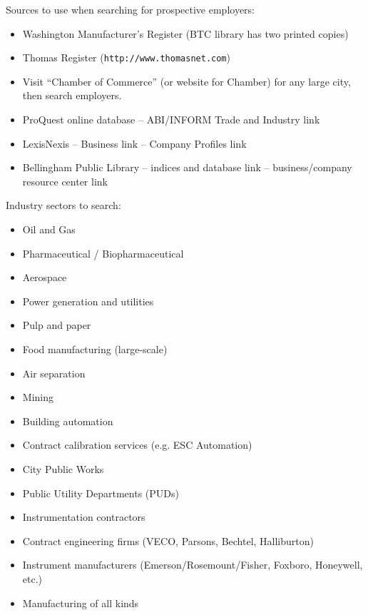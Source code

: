 





Sources to use when searching for prospective employers:

\begin{itemize}
\item{} Washington Manufacturer's Register (BTC library has two printed copies)
\item{} Thomas Register ({\tt http://www.thomasnet.com})
\item{} Visit ``Chamber of Commerce'' (or website for Chamber) for any large city, then search employers.
\item{} ProQuest online database -- ABI/INFORM Trade and Industry link
\item{} LexisNexis -- Business link -- Company Profiles link
\item{} Bellingham Public Library -- indices and database link -- business/company resource center link
\end{itemize}

\vskip 10pt

Industry sectors to search:

\begin{itemize}
\item{} Oil and Gas
\item{} Pharmaceutical / Biopharmaceutical
\item{} Aerospace
\item{} Power generation and utilities
\item{} Pulp and paper
\item{} Food manufacturing (large-scale)
\item{} Air separation
\item{} Mining
\item{} Building automation
\item{} Contract calibration services (e.g. ESC Automation)
\item{} City Public Works
\item{} Public Utility Departments (PUDs)
\item{} Instrumentation contractors
\item{} Contract engineering firms (VECO, Parsons, Bechtel, Halliburton)
\item{} Instrument manufacturers (Emerson/Rosemount/Fisher, Foxboro, Honeywell, etc.)
\item{} Manufacturing of all kinds
\end{itemize}




